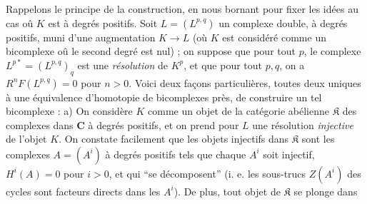 Rappelons le principe de la construction, en nous bornant pour fixer les idées
au cas oû $K$ est à degrés positifs. Soit $L=(L^{p,q})$ un complexe double, à
degrés positifs, muni d'une augmentation $K\to L$ (où $K$ est
considéré comme un bicomplexe oû le second degré est nul) ; on suppose que pour
tout $p$, le complexe $L^{p*}=(L^{p,q})_q$ est une \textit{résolution} de
$K^p$, et que pour tout $p,q$, on a $R^nF(L^{p,q})=0$ pour $n>0$. Voici deux
façons particulières, toutes deux uniques à une équivalence d'homotopie de
bicomplexes près, de construire un tel bicomplexe : a) On considère $K$ comme
un objet de la catégorie abélienne $\mathfrak K$ des complexes dans $\mathbf{C}$ à
degrés positifs, et on prend pour $L$ une résolution \textit{injective} de
l'objet $K$. On constate facilement que les objets injectifs dans $\mathfrak K$
sont les complexes $A=(A^i)$ à degrés positifs tels que chaque $A^i$ soit
injectif, $H^i(A)=0$ pour $i>0$, et qui ``se décomposent'' (i. e. les
sous-trucs $Z(A^i)$ des cycles sont facteurs directs dans les $A^i$). De plus,
tout objet de $\mathfrak K$ se plonge dans


